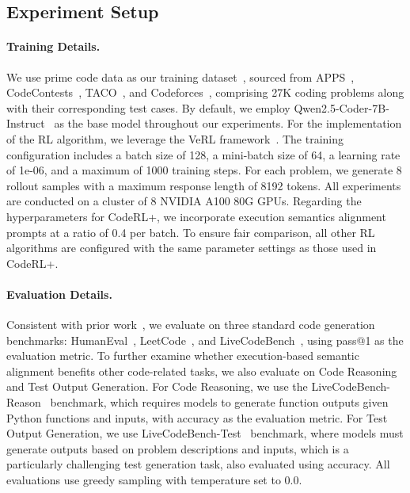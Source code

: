 \documentclass{article}
\DeclareRobustCommand{\ourapproach}{{\sc CodeRL+}\xspace}
\theoremstyle{definition}
\theoremstyle{remark}
\newcounter{prompt}
\begin{document}
\subsection{Experiment Setup}

\paragraph{Training Details.}
We use prime code data as our training dataset~\citep{PRIME_Zero}, sourced from APPS~\citep{APPS}, CodeContests~\citep{alphacode}, TACO~\citep{TACO}, and Codeforces~\citep{Codeforces}, comprising 27K coding problems along with their corresponding test cases.
By default, we employ Qwen2.5-Coder-7B-Instruct~\citep{hui2024qwen2} as the base model throughout our experiments. For the implementation of the RL algorithm, we leverage the VeRL framework~\citep{sheng2024hybridflow}. The training configuration includes a batch size of 128, a mini-batch size of 64, a learning rate of 1e-06, and a maximum of 1000 training steps. For each problem, we generate 8 rollout samples with a maximum response length of 8192 tokens. All experiments are conducted on a cluster of 8 NVIDIA A100 80G GPUs.
Regarding the hyperparameters for \ourapproach, we incorporate execution semantics alignment prompts at a ratio of 0.4 per batch. To ensure fair comparison, all other RL algorithms are configured with the same parameter settings as those used in \ourapproach.


\paragraph{Evaluation Details.}  
Consistent with prior work~\citep{li2025codeprm,codereasoner,wang2025codeboost}, we evaluate on three standard code generation benchmarks: HumanEval~\citep{chen2021evaluating}, LeetCode~\citep{leetcode}, and LiveCodeBench~\citep{jain2024livecodebench}, using pass@1 as the evaluation metric.
To further examine whether execution-based semantic alignment benefits other code-related tasks, we also evaluate on Code Reasoning and Test Output Generation. For Code Reasoning, we use the LiveCodeBench-Reason~\citep{jain2024livecodebench} benchmark, which requires models to generate function outputs given Python functions and inputs, with accuracy as the evaluation metric. For Test Output Generation, we use LiveCodeBench-Test~\citep{jain2024livecodebench} benchmark, where models must generate outputs based on problem descriptions and inputs, which is a particularly challenging test generation task, also evaluated using accuracy.
All evaluations use greedy sampling with temperature set to 0.0.
\end{document}
